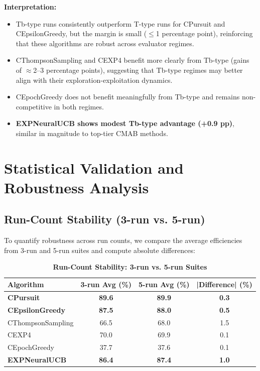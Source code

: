 \documentclass[12pt,a4paper]{article}
\newcommand{\success}[1]{\textcolor{successcolor}{\textbf{#1}}}
\newcommand{\legacy}[1]{\textcolor{legacycolor}{\textbf{#1}}}
\begin{document}
\textbf{Interpretation:}
\begin{itemize}
\item Tb-type runs consistently outperform T-type runs for CPursuit and CEpsilonGreedy, but the margin is small ($\leq$1 percentage point), reinforcing that these algorithms are robust across evaluator regimes.
\item CThompsonSampling and CEXP4 benefit more clearly from Tb-type (gains of $\approx$2–3 percentage points), suggesting that Tb-type regimes may better align with their exploration-exploitation dynamics.
\item CEpochGreedy does not benefit meaningfully from Tb-type and remains non-competitive in both regimes.
\item \legacy{EXPNeuralUCB shows modest Tb-type advantage (+0.9 pp)}, similar in magnitude to top-tier CMAB methods.
\end{itemize}

\section{Statistical Validation and Robustness Analysis}

\subsection{Run-Count Stability (3-run vs. 5-run)}

To quantify robustness across run counts, we compare the average efficiencies from 3-run and 5-run suites and compute absolute differences:

\begin{table}[H]
\centering
\caption{\success{Run-Count Stability: 3-run vs. 5-run Suites}}
\begin{tabular}{|l|c|c|c|}
\hline
\textbf{Algorithm} & \textbf{3-run Avg (\%)} & \textbf{5-run Avg (\%)} & \textbf{|Difference| (\%)} \\
\hline
\hline
\success{CPursuit}        & \success{89.6} & \success{89.9} & \success{0.3} \\
\success{CEpsilonGreedy} & \success{87.5} & \success{88.0} & \success{0.5} \\
CThompsonSampling        & 66.5          & 68.0          & 1.5 \\
CEXP4                    & 70.0          & 69.9          & 0.1 \\
CEpochGreedy             & 37.7          & 37.6          & 0.1 \\
\legacy{EXPNeuralUCB}    & \legacy{86.4} & \legacy{87.4} & \legacy{1.0} \\
\hline
\end{tabular}
\end{table}
\end{document}
